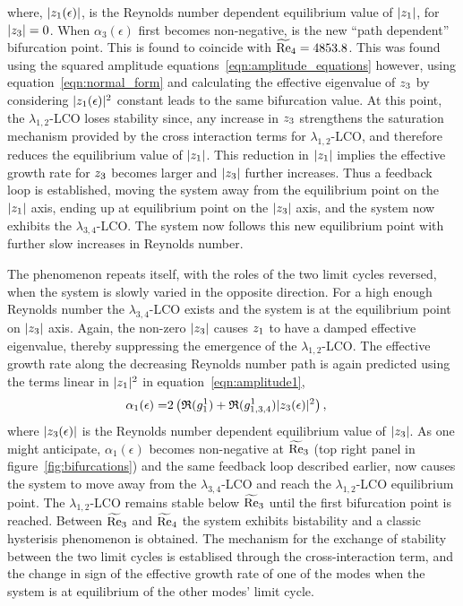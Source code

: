 where, $|z_{1}(\epsilon)|$, is the Reynolds number dependent equilibrium value of $|z_{1}|$, for $|z_{3}|=0$. When $\alpha_{3}(\epsilon)$ first becomes non-negative, is the new ``path dependent'' bifurcation point. This is found to coincide with $\widetilde{\mathrm{Re}}_{4}=4853.8$. This was found using the squared amplitude equations~\eqref{eqn:amplitude_equations} however, using equation~\eqref{eqn:normal_form} and calculating the effective eigenvalue of $z_{3}$ by considering $|z_{1}(\epsilon)|^{2}$ constant leads to the same bifurcation value. At this point, the $\lambda_{1,2}$-LCO loses stability since, any increase in $z_{3}$ strengthens the saturation mechanism provided by the cross interaction terms for $\lambda_{1,2}$-LCO, and therefore reduces the equilibrium value of $|z_{1}|$. This reduction in $|z_{1}|$ implies the effective growth rate for $z_{3}$ becomes larger and $|z_{3}|$ further increases. Thus a feedback loop is established, moving the system away from the equilibrium point on the $|z_{1}|$ axis, ending up at equilibrium point on the $|z_{3}|$ axis, and the system now exhibits the $\lambda_{3,4}$-LCO. The system now follows this new equilibrium point with further slow increases in Reynolds number. 

The phenomenon repeats itself, with the roles of the two limit cycles reversed, when the system is slowly varied in the opposite direction. For a high enough Reynolds number the $\lambda_{3,4}$-LCO exists and the system is at the equilibrium point on $|z_{3}|$ axis. Again, the non-zero $|z_{3}|$ causes $z_{1}$ to have a damped effective eigenvalue, thereby suppressing the emergence of the $\lambda_{1,2}$-LCO. The effective growth rate along the decreasing Reynolds number path is again predicted using the terms linear in $|z_{1}|^{2}$ in equation~\eqref{eqn:amplitude1}, 
\begin{align}
	\alpha_{1}(\epsilon) =& 2\left(\mathfrak{R}(g^{1}_{1}) + \mathfrak{R}(g^{1}_{1,3,4})|z_{3}(\epsilon)|^{2}\right), \nonumber
\end{align}
where $|z_{3}(\epsilon)|$ is the Reynolds number dependent equilibrium value of $|z_{3}|$. As one might anticipate, $\alpha_{1}(\epsilon)$ becomes non-negative at $\widetilde{\mathrm{Re}}_{3}$ (top right panel in figure~\ref{fig:bifurcations}) and the same feedback loop described earlier, now causes the system to move away from the $\lambda_{3,4}$-LCO and reach the $\lambda_{1,2}$-LCO equilibrium point. The $\lambda_{1,2}$-LCO remains stable below $\widetilde{\mathrm{Re}}_{3}$ until the first bifurcation point is reached. Between $\widetilde{\mathrm{Re}}_{3}$ and $\widetilde{\mathrm{Re}}_{4}$ the system exhibits bistability and a classic hysterisis phenomenon is obtained. The mechanism for the exchange of stability between the two limit cycles is establised through the cross-interaction term, and the change in sign of the effective growth rate of one of the modes when the system is at equilibrium of the other modes' limit cycle. 

